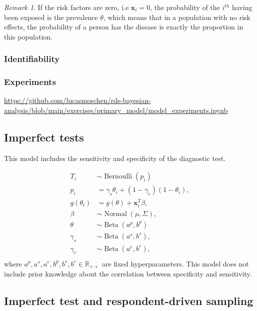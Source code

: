 \documentclass[a4paper, notitlepage, 11pt]{article}
\newcommand{\R}{\mathbb{R}}
\newcommand{\x}{\boldsymbol{x}}
\newcommand{\N}{\operatorname{Normal}}
\newcommand{\betadist}{\operatorname{Beta}}
\theoremstyle{definition}
\theoremstyle{remark}
\newtheorem*{remark}{Remark}
\begin{document}
\begin{remark}
  If the risk factors are zero, i.e $\x_i = 0$, the probability of the
  $i^{th}$ having been exposed is the prevalence $\theta$, which means that in
  a population with no risk effects, the probability of a person has the
  disease is exactly the proportion in this population. 
\end{remark}

\subsubsection{Identifiability}

\subsubsection{Experiments}

\url{https://github.com/lucasmoschen/rds-bayesian-analysis/blob/main/exercises/primary_model/model_experiments.ipynb}

\subsection{Imperfect tests}

This model includes the sensitivity and specificity of the diagnostic test. 

\begin{equation}
  \begin{aligned}
    T_i &\sim \operatorname{Bernoulli}(p_i) \\
    p_i &= \gamma_s\theta_i + (1-\gamma_e)(1 - \theta_i),  \\
    g(\theta_i) &= g(\theta) + \x_i^T\beta,  \\
    \beta &\sim \N(\mu, \Sigma), \\ 
    \theta &\sim \betadist(a^p, b^p) \\
    \gamma_s &\sim \betadist(a^s, b^s), \\
    \gamma_e &\sim \betadist(a^e, b^e), \\    
  \end{aligned}  
\end{equation}
where $a^p, a^s, a^e, b^p, b^s, b^e \in \R_{++}$ are fixed hyperparameters.
This model does not include prior knowledge about the correlation between
specificity and sensitivity. 

\subsection{Imperfect test and respondent-driven sampling}
\end{document}
